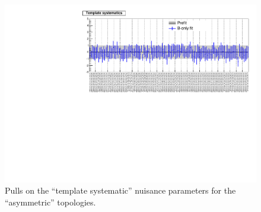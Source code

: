 \newpage
\begin{landscape}
\begin{figure}[h!]
\caption{Pulls on the ``template systematic'' nuisance parameters for the ``asymmetric'' topologies.\label{fig:nuisPull_template_asym}}
    \includegraphics[width=\linewidth]{figures/postFitResults/nuisances/template_asym_ALL_nuisances.pdf}
\end{figure}
\end{landscape}





